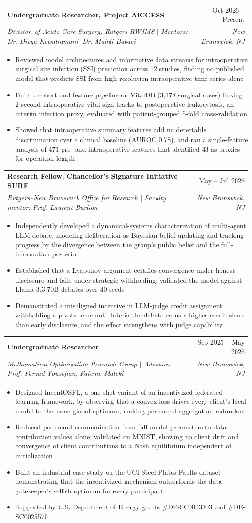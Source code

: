 \documentclass[letterpaper,11pt]{article}
\makeatletter
\newcommand{\resumeItem}[1]{
  \item\small{
    {#1 \vspace{-2pt}}
  }
}
\newcommand{\resumeSubheading}[4]{
  \vspace{-2pt}\item
    \begin{tabular*}{0.97\textwidth}[t]{l@{\extracolsep{\fill}}r}
      \textbf{#1} & #2 \\
      \textit{\small#3} & \textit{\small #4} \\
    \end{tabular*}\vspace{-7pt}
}
\newcommand{\resumeItemListStart}{\begin{itemize}}
\newcommand{\resumeItemListEnd}{\end{itemize}\vspace{-5pt}}
\makeatother
\begin{document}
    \resumeSubheading
    {Undergraduate Researcher, Project AiCCESS}{Oct 2026 -- Present}
    {Division of Acute Care Surgery, Rutgers RWJMS $|$ Mentors: Dr. Divya Kewalramani, Dr. Mahdi Babaei}{New Brunswick, NJ}
    \resumeItemListStart
      \resumeItem{Reviewed model architectures and informative data streams for intraoperative surgical site infection (SSI) prediction across 12 studies, finding no published model that predicts SSI from high-resolution intraoperative time series alone}
      \resumeItem{Built a cohort and feature pipeline on VitalDB (3,178 surgical cases) linking 2-second intraoperative vital-sign tracks to postoperative leukocytosis, an interim infection proxy, evaluated with patient-grouped 5-fold cross-validation}
      \resumeItem{Showed that intraoperative summary features add no detectable discrimination over a clinical baseline (AUROC 0.78), and ran a single-feature analysis of 471 pre- and intraoperative features that identified 43 as proxies for operation length}
    \resumeItemListEnd

    \resumeSubheading
      {Research Fellow, Chancellor's Signature Initiative SURF}{May -- Jul 2026}
      {Rutgers--New Brunswick Office for Research $|$ Faculty mentor: Prof. Laurent Burlion}{New Brunswick, NJ}
      \resumeItemListStart
        \resumeItem{Independently developed a dynamical-systems characterization of multi-agent LLM debate, modeling deliberation as Bayesian belief updating and tracking progress by the divergence between the group's public belief and the full-information posterior}
        \resumeItem{Established that a Lyapunov argument certifies convergence under honest disclosure and fails under strategic withholding; validated the model against Llama-3.3-70B debates over 40 seeds}
        \resumeItem{Demonstrated a misaligned incentive in LLM-judge credit assignment: withholding a pivotal clue until late in the debate earns a higher credit share than early disclosure, and the effect strengthens with judge capability}
      \resumeItemListEnd

    \resumeSubheading
      {Undergraduate Researcher}{Sep 2025 -- May 2026}
      {Mathematical Optimization Research Group $|$ Advisors: Prof. Farzad Yousefian, Fateme Maleki}{New Brunswick, NJ}
      \resumeItemListStart
        \resumeItem{Designed IncentOSFL, a one-shot variant of an incentivized federated learning framework, by observing that a convex loss drives every client's local model to the same global optimum, making per-round aggregation redundant}
        \resumeItem{Reduced per-round communication from full model parameters to data-contribution values alone; validated on MNIST, showing no client drift and convergence of client contributions to a Nash equilibrium independent of initialization}
        \resumeItem{Built an industrial case study on the UCI Steel Plates Faults dataset demonstrating that the incentivized mechanism outperforms the data-gatekeeper's selfish optimum for every participant}
        \resumeItem{Supported by U.S. Department of Energy grants \#DE-SC0023303 and \#DE-SC0025570}
      \resumeItemListEnd
\end{document}
